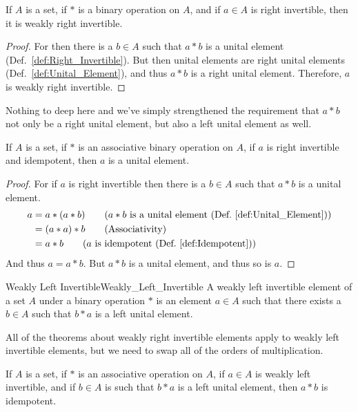     \begin{theorem}
        \label{thm:r_inv_implies_weak_r_inv}%
        If $A$ is a set, if $*$ is a binary operation on $A$, and if $a\in{A}$
        is right invertible, then it is weakly right invertible.
    \end{theorem}
    \begin{proof}
        For then there is a $b\in{A}$ such that $a*b$ is a unital element
        (Def.~\ref{def:Right_Invertible}). But then unital elements are
        right unital elements (Def.~\ref{def:Unital_Element}), and thus $a*b$
        is a right unital element. Therefore, $a$ is weakly right invertible.
    \end{proof}
    Nothing to deep here and we've simply strengthened the requirement that
    $a*b$ not only be a right unital element, but also a left unital element as
    well.
    \begin{theorem}
        \label{thm:assoc_right_idem_inv_is_unit}%
        If $A$ is a set, if $*$ is an associative binary operation on $A$, if
        $a$ is right invertible and idempotent, then $a$ is a unital element.
    \end{theorem}
    \begin{proof}
        For if $a$ is right invertible then there is a $b\in{A}$ such that
        $a*b$ is a unital element.
        \begin{align}
            a&=a*(a*b)
            \tag{$a*b$ is a unital element (Def.~\ref{def:Unital_Element})}\\
            &=(a*a)*b
            \tag{Associativity}\\
            &=a*b
            \tag{$a$ is idempotent (Def.~\ref{def:Idempotent})}
        \end{align}
        And thus $a=a*b$. But $a*b$ is a unital element, and thus so is $a$.
    \end{proof}
    \begin{fdefinition}{Weakly Left Invertible}{Weakly_Left_Invertible}
        A weakly left invertible element of a \gls{set} $A$ under a
        \gls{binary operation} $*$ is an element $a\in{A}$ such that there
        exists a $b\in{A}$ such that $b*a$ is a left unital element.
    \end{fdefinition}
    All of the theorems about weakly right invertible elements apply to weakly
    left invertible elements, but we need to swap all of the orders of
    multiplication.
    \begin{theorem}
        If $A$ is a set, if $*$ is an associative operation on $A$, if $a\in{A}$
        is weakly left invertible, and if $b\in{A}$ is such that $b*a$ is a left
        unital element, then $a*b$ is idempotent.
    \end{theorem}
